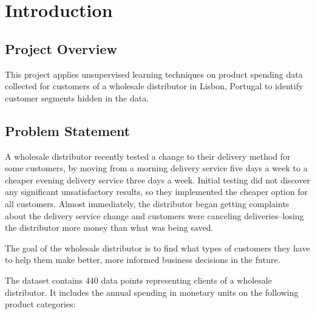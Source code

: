 \documentclass[twoside,openright,titlepage,numbers=noenddot,headinclude,%
               footinclude=true,cleardoublepage=empty,abstractoff,BCOR=5mm,%
               paper=a4,fontsize=11pt,ngerman,american]{scrreprt}
\numberwithin{theorem}{chapter}
\numberwithin{definition}{chapter}
\numberwithin{algorithm}{chapter}
\numberwithin{figure}{chapter}
\numberwithin{table}{chapter}
\numberwithin{equation}{chapter}
\begin{document}
\frenchspacing
\raggedbottom
{}
\pagestyle{plain}





\cleardoublepage


\chapter*{Introduction}

\section*{Project Overview}

This project applies unsupervised learning techniques on product spending data collected for customers of a wholesale distributor in Lisbon, Portugal to identify customer segments hidden in the data. 

\section*{Problem Statement}

A wholesale distributor recently tested a change to their delivery method for some customers, by moving from a morning delivery service five days a week to a cheaper evening delivery service three days a week. Initial testing did not discover any significant unsatisfactory results, so they implemented the cheaper option for all customers. Almost immediately, the distributor began getting complaints about the delivery service change and customers were canceling deliveries--losing the distributor more money than what was being saved.

The goal of the wholesale distributor is to find what types of customers they have to help them make better, more informed business decisions in the future.

The dataset contains 440 data points representing clients of a wholesale distributor. It includes the annual spending in monetary units on the following product categories:
\end{document}

